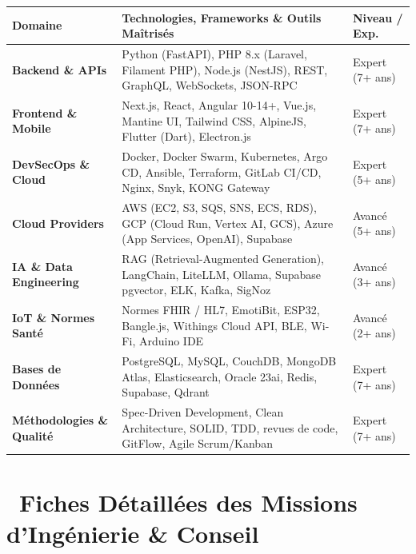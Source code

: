 \documentclass[10pt,a4paper]{article}
\begin{document}
\renewcommand{\arraystretch}{1.2}
\begin{tabularx}{\linewidth}{@{}p{3.5cm} X >{\raggedleft\arraybackslash}p{2.8cm}@{}}
\toprule
\textbf{Domaine} & \textbf{Technologies, Frameworks \& Outils Maîtrisés} & \textbf{Niveau / Exp.} \\
\midrule
\textbf{Backend \& APIs} & Python (FastAPI), PHP 8.x (Laravel, Filament PHP), Node.js (NestJS), REST, GraphQL, WebSockets, JSON-RPC & Expert (7+ ans) \\
\textbf{Frontend \& Mobile} & Next.js, React, Angular 10-14+, Vue.js, Mantine UI, Tailwind CSS, AlpineJS, Flutter (Dart), Electron.js & Expert (7+ ans) \\
\textbf{DevSecOps \& Cloud} & Docker, Docker Swarm, Kubernetes, Argo CD, Ansible, Terraform, GitLab CI/CD, Nginx, Snyk, KONG Gateway & Expert (5+ ans) \\
\textbf{Cloud Providers} & AWS (EC2, S3, SQS, SNS, ECS, RDS), GCP (Cloud Run, Vertex AI, GCS), Azure (App Services, OpenAI), Supabase & Avancé (5+ ans) \\
\textbf{IA \& Data Engineering} & RAG (Retrieval-Augmented Generation), LangChain, LiteLLM, Ollama, Supabase pgvector, ELK, Kafka, SigNoz & Avancé (3+ ans) \\
\textbf{IoT \& Normes Santé} & Normes FHIR / HL7, EmotiBit, ESP32, Bangle.js, Withings Cloud API, BLE, Wi-Fi, Arduino IDE & Avancé (2+ ans) \\
\textbf{Bases de Données} & PostgreSQL, MySQL, CouchDB, MongoDB Atlas, Elasticsearch, Oracle 23ai, Redis, Supabase, Qdrant & Expert (7+ ans) \\
\textbf{Méthodologies \& Qualité} & Spec-Driven Development, Clean Architecture, SOLID, TDD, revues de code, GitFlow, Agile Scrum/Kanban & Expert (7+ ans) \\
\bottomrule
\end{tabularx}
\renewcommand{\arraystretch}{1.0}

\newpage

\section{\faBriefcase\ Fiches Détaillées des Missions d'Ingénierie \& Conseil}
\end{document}
